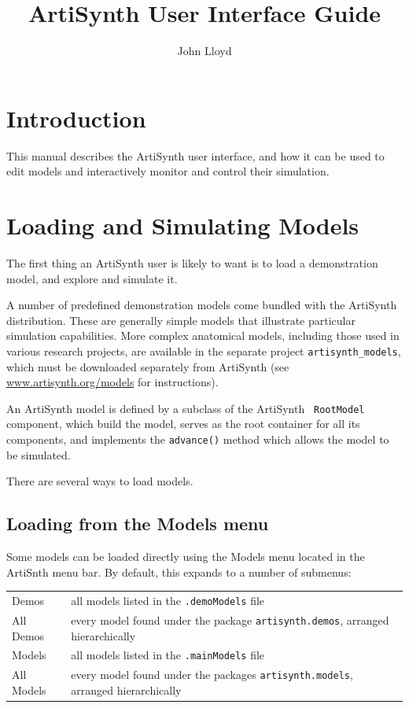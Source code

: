 \documentclass{article}
\title{ArtiSynth User Interface Guide}
\author{John Lloyd}
\date{}
\begin{document}
\maketitle

\iflatexml{\large\pubdate}\fi

\tableofcontents

\section{Introduction}

This manual describes the ArtiSynth user interface, and how it can be
used to edit models and interactively monitor and control their
simulation.

\section{Loading and Simulating Models}

The first thing an ArtiSynth user is likely to want is to load a
demonstration model, and explore and simulate it.

A number of predefined demonstration models come bundled with the
ArtiSynth distribution. These are generally simple models that
illustrate particular simulation capabilities. More complex
anatomical models, including those used in various research projects,
are available in the separate project {\tt artisynth\_models}, which
must be downloaded separately from ArtiSynth (see
\href{http://www.artisynth.org/models}{www.artisynth.org/models} 
for instructions).

An ArtiSynth model is defined by a subclass of the ArtiSynth {\tt
RootModel} component, which build the model, serves as the root
container for all its components, and implements the {\tt advance()}
method which allows the model to be simulated.

There are several ways to load models.

\subsection{Loading from the Models menu}
\label{LoadingFromModelsMenu}

Some models can be loaded directly using the {\sf Models} menu located
in the ArtiSnth menu bar. By default, this expands to a number of
submenus:

\begin{tabular}{ll}
{\sf Demos} & all models listed in the {\tt .demoModels} file\\
{\sf All Demos} & every model found under the package {\tt artisynth.demos}, 
arranged hierarchically\\
{\sf Models} & all models listed in the {\tt .mainModels} file\\
{\sf All Models} & every model found under the packages 
{\tt artisynth.models}, arranged hierarchically
\end{tabular}
\medskip
\end{document}
